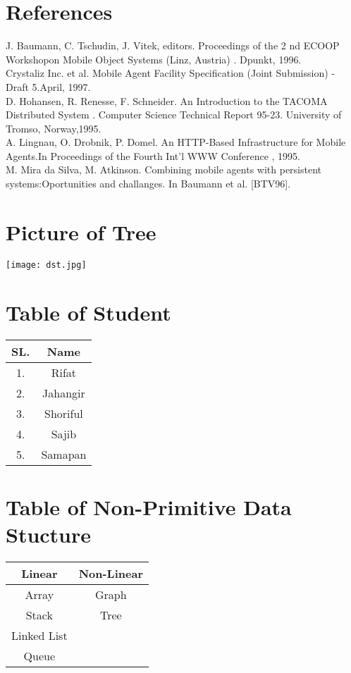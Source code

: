 \documentclass{article}
\begin{document}
\section{References}
J. Baumann, C. Tschudin, J. Vitek, editors.
 Proceedings of the 2
nd 
 ECOOP Workshopon Mobile Object Systems (Linz, Austria)
. Dpunkt, 1996.\\
 Crystaliz Inc. et al. Mobile Agent Facility Specification (Joint Submission) - Draft 5.April, 1997.\\
 D. Hohansen, R. Renesse, F. Schneider.
 An Introduction to the TACOMA Distributed System
. Computer Science Technical Report 95-23. University of Tromso, Norway,1995.\\
A. Lingnau, O. Drobnik, P. Domel. An HTTP-Based Infrastructure for Mobile Agents.In
 Proceedings of the Fourth Int’l WWW Conference
, 1995.\\
M. Mira da Silva, M. Atkinson. Combining mobile agents with persistent systems:Oportunities and challanges. In Baumann et al. [BTV96].


\section{Picture of Tree}
\texttt{[image: dst.jpg]}
\section{Table of Student}
\begin{center}
\begin{tabular}{|c|c|}
\hline
   SL. & Name \\
   \hline
    1. & Rifat \\
    2. & Jahangir \\
    3. & Shoriful \\
    4. & Sajib \\
    5. & Samapan\\
    \hline
\end{tabular}
\end{center}
\section{Table of Non-Primitive Data Stucture}
\begin{center}
\begin{tabular}{|c|c|}
\hline
   Linear & Non-Linear \\
   \hline
    Array & Graph \\
    Stack & Tree \\
    Linked List &  \\
    Queue &  \\
    
    \hline
\end{tabular}
\end{center}
\end{document}

